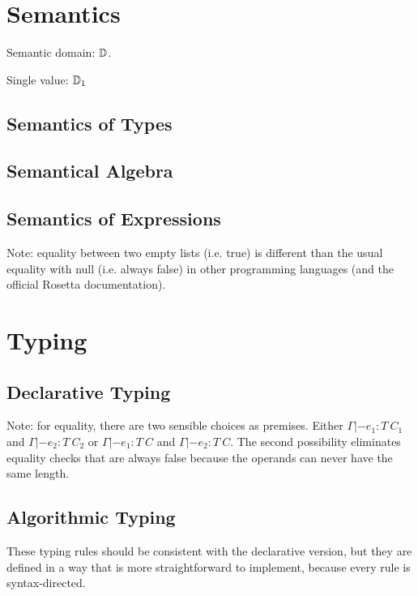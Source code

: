 \documentclass[english,11pt,a4paper]{article}
\begin{document}


\section{Semantics}

Semantic domain: $\mathbb{D}$.

Single value: $\mathbb{D}_1$

\subsection{Semantics of Types}


\subsection{Semantical Algebra}


\subsection{Semantics of Expressions}


Note: equality between two empty lists (i.e. true) is different than the usual equality with null (i.e. always false) in other programming languages (and the official Rosetta documentation).


\section{Typing}

\subsection{Declarative Typing}



Note: for equality, there are two sensible choices as premises. Either $\Gamma |- e_1 : T\ C_1$ and $\Gamma |- e_2 : T\ C_2$ or $\Gamma |- e_1 : T\ C$ and $\Gamma |- e_2 : T\ C$. The second possibility eliminates equality checks that are always false because the operands can never have the same length.

\subsection{Algorithmic Typing}

These typing rules should be consistent with the declarative version, but they are defined in a way that is more straightforward to implement, because every rule is syntax-directed.


\end{document}
